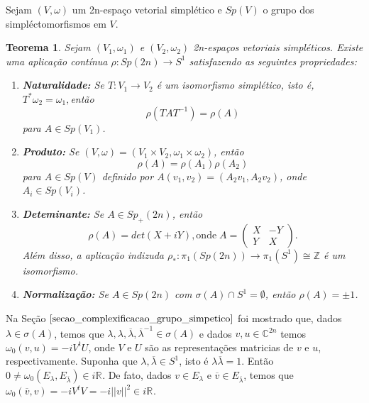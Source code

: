 \documentclass[12pt]{book}
\newtheorem{teorema}{Teorema}[section]
\newcommand{\circulo}{S^{1}}
\newcommand{\complexo}[1]{\mathbb{C}^{#1}}
\newcommand{\formaSimpleticaPadrao}[2]{\omega_{0}(#1, #2)}
\newcommand{\grupofundamental}[1]{\pi_{1}(#1)}
\newcommand{\gruposimpletico}[1]{Sp(#1)}
\newcommand{\gruposimpleticopositivo}[1]{Sp_{+}(#1)}
\newcommand{\inteiros}{\mathbb{Z}}
\newcommand{\norma}[1]{||#1||}
\newcommand{\real}[1]{\mathbb{R}^{#1}}
\newcommand{\reta}{\real{}}
\begin{document}
	Sejam $(V, \omega)$ um 2n-espaço vetorial simplético e $\gruposimpletico{V}$ o grupo dos simpléctomorfismos em $V$. 
	\begin{teorema}\label{teorema_aplicacao_rho}
		Sejam $(V_{1}, \omega_{1})$ e $(V_{2}, \omega_{2})$ 2n-espaços vetoriais simpléticos. Existe uma aplicação contínua $\rho:Sp(2n) \to S^{1}$ satisfazendo as seguintes propriedades:
		\begin{enumerate}
			\item \textbf{Naturalidade:}  Se $T:V_{1} \to V_{2}$ é um isomorfismo simplético, isto é, $T^{*}\omega_{2} = \omega_{1}, $então 
			$$
			\rho(TAT^{-1}) = \rho(A)
			$$
			para $A\in \gruposimpletico{V_{1}}$.
			
			\item \textbf{Produto:} Se $(V,\omega) = (V_{1}\times V_{2},\omega_{1}\times \omega_{2})$, então
			$$
			\rho(A) = \rho(A_{1})\rho(A_{2})
			$$
			para $A\in \gruposimpletico{V}$ definido por $A(v_{1}, v_{2})=(A_{2}v_{1}, A_{2}v_{2})$, onde $A_{i} \in \gruposimpletico{V_{i}}$.
			
			\item \textbf{Deteminante:} Se $A\in \gruposimpleticopositivo{2n}$, então 
			$$
			\rho(A) = det(X+iY), \text{onde} \;	
			A=\left(
			\begin{array}{cc}
			X & -Y					\\
			Y & X
			\end{array}
			\right).
			$$
			Além disso, a aplicação indizuda $\rho_{*}: \grupofundamental{\gruposimpletico{2n}} \to \grupofundamental{\circulo} \cong \inteiros$ é um isomorfismo.
			
			\item \textbf{Normalização:} Se $A \in \gruposimpletico{2n}$ com $\sigma(A)\cap \circulo = \emptyset$, então $\rho(A) = \pm 1$.
		\end{enumerate}
	\end{teorema}
	
	Na Seção $\ref{secao_complexificacao_grupo_simpetico}$ foi mostrado que, dados $\lambda \in \sigma(A)$, temos que $\lambda, \lambda , \overline{\lambda}, \overline{\lambda}^{-1}  \in \sigma(A)$ e dados $v, u \in \complexo{2n}$ temos $\formaSimpleticaPadrao{v}{u}= -iV^{t}U$, onde $V$ e $U$ são as representações matricias de $v$ e $u$, respectivamente. Suponha que $\lambda, \overline{\lambda} \in \circulo$, isto é $\lambda\overline{\lambda} = 1$. Então $0 \neq \formaSimpleticaPadrao{E_{\lambda}}{E_{\overline{\lambda}}} \in i\reta$. De fato, dados $v \in E_{\lambda}$ e $\overline{v} \in E_{\overline{\lambda}}$, temos que  $\formaSimpleticaPadrao{\overline{v}}{v} =-iV^{t}V=- i\norma{v}^{2}\in i\reta$. 
	
\end{document}
